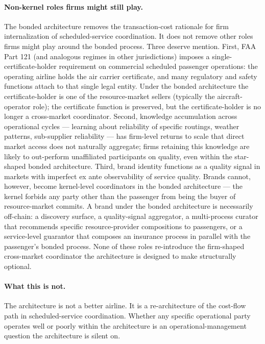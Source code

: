\documentclass[11pt,a4paper]{article}
\theoremstyle{definition}
\theoremstyle{remark}
\begin{document}
\paragraph{Non-kernel roles firms might still play.}
The bonded architecture removes the transaction-cost rationale
for firm internalization of scheduled-service coordination. It
does not remove other roles firms might play around the bonded
process. Three deserve mention. First, FAA Part 121 (and
analogous regimes in other jurisdictions) imposes a
single-certificate-holder requirement on commercial scheduled
passenger operations: the operating airline holds the air
carrier certificate, and many regulatory and safety functions
attach to that single legal entity. Under the bonded architecture
the certificate-holder is one of the resource-market sellers
(typically the aircraft-operator role); the certificate function
is preserved, but the certificate-holder is no longer a
cross-market coordinator. Second, knowledge accumulation across
operational cycles --- learning about reliability of specific
routings, weather patterns, sub-supplier reliability --- has
firm-level returns to scale that direct market access does not
naturally aggregate; firms retaining this knowledge are likely to
out-perform unaffiliated participants on quality, even within the
star-shaped bonded architecture. Third, brand identity functions
as a quality signal in markets with imperfect ex ante
observability of service quality. Brands cannot, however, become
kernel-level coordinators in the bonded architecture --- the
kernel forbids any party other than the passenger from being the
buyer of resource-market commits. A brand under the bonded
architecture is necessarily off-chain: a discovery surface, a
quality-signal aggregator, a multi-process curator that
recommends specific resource-provider compositions to passengers,
or a service-level guarantor that composes an insurance process
in parallel with the passenger's bonded process. None of these
roles re-introduce the firm-shaped cross-market coordinator the
architecture is designed to make structurally optional.

\paragraph{What this is not.}
The architecture is not a better airline. It is a re-architecture
of the cost-flow path in scheduled-service coordination. Whether
any specific operational party operates well or poorly within the
architecture is an operational-management question the
architecture is silent on.
\end{document}
